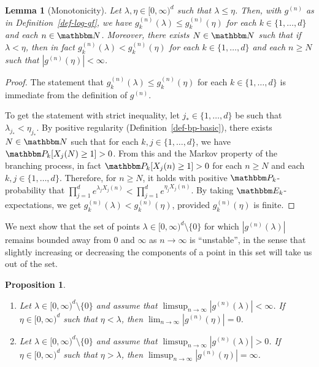 \documentclass[11pt]{article}
\theoremstyle{plain}
\newtheorem{lem}[thm]{Lemma}
\newtheorem{prop}[thm]{Proposition}
\theoremstyle{definition}
\numberwithin{equation}{section}
\newcommand{\BB}{\mathbbm}
\let\originalleft\left
\let\originalright\right
\renewcommand{\left}{\mathopen{}\mathclose\bgroup\originalleft}
\renewcommand{\right}{\aftergroup\egroup\originalright}
\begin{document}
\begin{lem}[Monotonicity] \label{lem-mono}
Let $\lambda,\eta \in [0,\infty)^d$ such that $\lambda \leq \eta$.
Then, with $g^{(n)}$ as in Definition~\ref{def-log-gf}, we have $g_k^{(n)}(\lambda) \leq g_k^{(n)}(\eta)$ for each $k \in \{1,\dots,d\}$ and each $n\in\BB N$.
Moreover, there exists $N\in\BB N$ such that if $\lambda < \eta$, then in fact $g_k^{(n)}(\lambda) < g_k^{(n)}(\eta)$ for each $k\in \{1,\dots,d\}$ and each $n \geq N$ such that $|g^{(n)}(\eta)|<\infty$. 
\end{lem}
\begin{proof}
The statement that $g_k^{(n)}(\lambda) \leq g_k^{(n)}(\eta)$ for each $k \in \{1,\dots,d\}$ is immediate from the definition of $g^{(n)}$. 

To get the statement with strict inequality, let $j_* \in \{1,\dots,d\}$ be such that $\lambda_{j_*} < \eta_{j_*}$. By positive regularity (Definition~\ref{def-bp-basic}), there exists $N\in\BB N$ such that for each $k , j\in \{1,\dots,d\}$, we have $\BB P_k\left[ X_j(N) \geq 1 \right] > 0$. From this and the Markov property of the branching process, in fact $\BB P_k\left[ X_j(n) \geq 1 \right] > 0$ for each $n \geq N$ and each $k,j\in \{1,\dots,d\}$. %
Therefore, for $n\geq N$, it holds with positive $\BB P_k$-probability that $\prod_{j=1}^d e^{\lambda_j X_j(n)}  < \prod_{j=1}^d e^{\eta_j X_j(n)}$. By taking $\BB E_k$-expectations, we get $g_k^{(n)}(\lambda) < g_k^{(n)}(\eta)$, provided $g_k^{(n)}(\eta)$ is finite.  
\end{proof}

We next show that the set of points $\lambda \in [0,\infty)^d\setminus \{0\}$ for which $|g^{(n)}(\lambda)|$ remains bounded away from 0 and $\infty$ as $n\to\infty$ is ``unstable'', in the sense that slightly increasing or decreasing the components of a point in this set will take us out of the set.

\begin{prop} \label{prop-unstable}
\begin{enumerate}[$(i)$]
\item Let $\lambda \in [0,\infty)^d \setminus \{0\}$ and assume that $\limsup_{n\to\infty} | g^{(n)}(\lambda)| < \infty$. 
If $\eta \in [0,\infty)^d$ such that $\eta < \lambda$, then $\lim_{n\to\infty} |g^{(n)}(\eta)| = 0$.  \label{item-unstable-zero}
\item Let $\lambda \in [0,\infty)^d \setminus \{0\}$ and assume that $\limsup_{n\to\infty} | g^{(n)}(\lambda)| > 0 $. 
If $\eta \in [0,\infty)^d$ such that $\eta > \lambda$, then $\limsup_{n\to\infty} |g^{(n)}(\eta)| = \infty$. \label{item-unstable-infty} 
\end{enumerate}
\end{prop}
\end{document}
